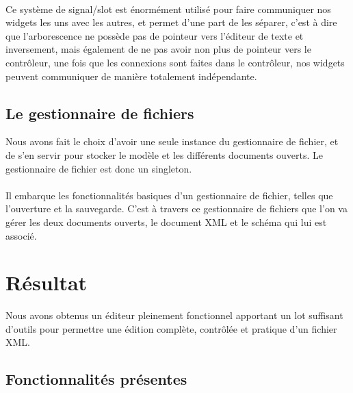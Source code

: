 \paragraph{}
Ce système de signal/slot est énormément utilisé pour faire communiquer nos widgets les uns avec les autres, et permet d'une part de les séparer, c'est à dire que l'arborescence ne possède pas de pointeur vers l'éditeur de texte et inversement, mais également de ne pas avoir non plus de pointeur vers le contrôleur, une fois que les connexions sont faites dans le contrôleur, nos widgets peuvent communiquer de manière totalement indépendante.

\subsection{Le gestionnaire de fichiers}
Nous avons fait le choix d'avoir une seule instance du gestionnaire de fichier, et de s'en servir pour stocker le modèle et les différents documents ouverts. Le gestionnaire de fichier est donc un singleton. 
\paragraph{}
Il embarque les fonctionnalités basiques d'un gestionnaire de fichier, telles que l'ouverture et la sauvegarde. C'est à travers ce gestionnaire de fichiers que l'on va gérer les deux documents ouverts, le document XML et le schéma qui lui est associé.

\section{Résultat}

Nous avons obtenus un éditeur pleinement fonctionnel apportant un lot suffisant d'outils pour permettre une édition complète, contrôlée et pratique d'un fichier XML.

\subsection{Fonctionnalités présentes}

